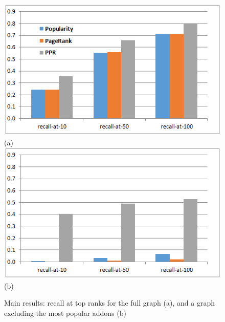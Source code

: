 \documentclass[ijoc,nonblindrev]{informs3} %
\numberwithin{equation}{subsection}
\begin{document}
\begin{figure}[t]
\centering
	\centering
\includegraphics[scale=0.8]{figures/pop-final.png} \\
(a) \\
	\centering
\includegraphics[scale=0.8]{figures/sans-popular-final.png} \\
(b) \\
	\caption{Main results: recall at top ranks for the full graph (a), and a graph excluding the most popular addons (b)}
	\label{fig:main}
\end{figure}
\fi
\end{document}
